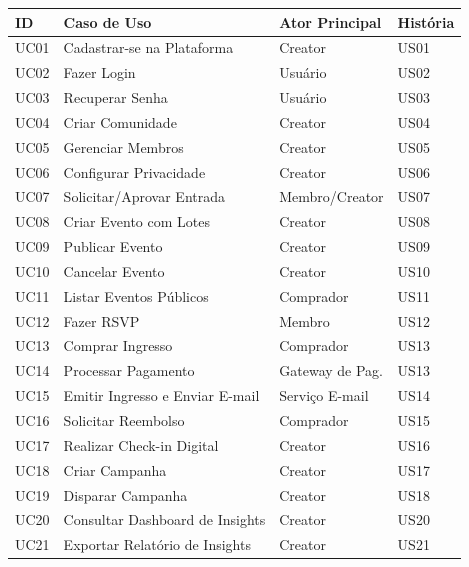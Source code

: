 \documentclass[12pt, a4paper]{article}
\begin{document}
\vspace{4pt}
\begin{longtable}{|L{1.4cm}|L{6.2cm}|L{3.2cm}|L{2.4cm}|}
  \hline
  \textbf{ID} & \textbf{Caso de Uso} & \textbf{Ator Principal} & \textbf{História} \\
  \hline \endhead
  UC01 & Cadastrar-se na Plataforma          & Creator        & US01 \\ \hline
  UC02 & Fazer Login                         & Usuário        & US02 \\ \hline
  UC03 & Recuperar Senha                     & Usuário        & US03 \\ \hline
  UC04 & Criar Comunidade                    & Creator        & US04 \\ \hline
  UC05 & Gerenciar Membros                   & Creator        & US05 \\ \hline
  UC06 & Configurar Privacidade              & Creator        & US06 \\ \hline
  UC07 & Solicitar/Aprovar Entrada           & Membro/Creator & US07 \\ \hline
  UC08 & Criar Evento com Lotes              & Creator        & US08 \\ \hline
  UC09 & Publicar Evento                     & Creator        & US09 \\ \hline
  UC10 & Cancelar Evento                     & Creator        & US10 \\ \hline
  UC11 & Listar Eventos Públicos             & Comprador      & US11 \\ \hline
  UC12 & Fazer RSVP                          & Membro         & US12 \\ \hline
  UC13 & Comprar Ingresso                    & Comprador      & US13 \\ \hline
  UC14 & Processar Pagamento                 & Gateway de Pag.& US13 \\ \hline
  UC15 & Emitir Ingresso e Enviar E-mail     & Serviço E-mail & US14 \\ \hline
  UC16 & Solicitar Reembolso                 & Comprador      & US15 \\ \hline
  UC17 & Realizar Check-in Digital           & Creator        & US16 \\ \hline
  UC18 & Criar Campanha                      & Creator        & US17 \\ \hline
  UC19 & Disparar Campanha                   & Creator        & US18 \\ \hline
  UC20 & Consultar Dashboard de Insights     & Creator        & US20 \\ \hline
  UC21 & Exportar Relatório de Insights      & Creator        & US21 \\ \hline
\end{longtable}
\end{document}
